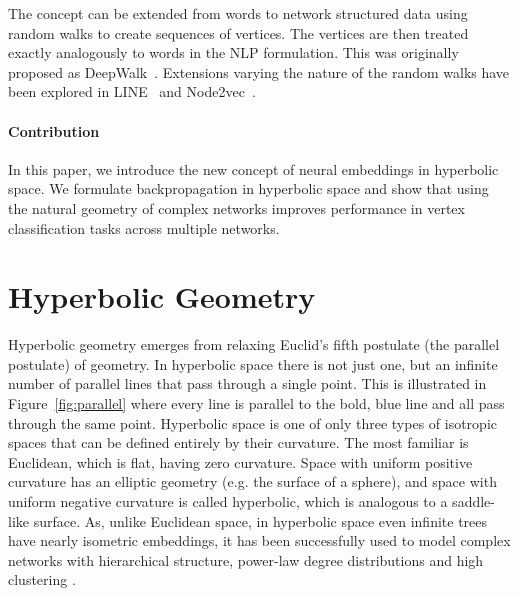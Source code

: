 \documentclass[sigconf, review]{acmart}
\begin{document}
The concept can be extended from words to network structured data using random walks to create sequences of vertices. The vertices are then treated exactly analogously to words in the NLP formulation. This was originally proposed as DeepWalk~\cite{Perozzi2014}. Extensions varying the nature of the random walks have been explored in LINE~\cite{Tang2015} and Node2vec~\cite{Grover}. 




\paragraph{Contribution}
In this paper, we introduce the new concept of neural embeddings in hyperbolic space. We formulate backpropagation in hyperbolic space and show that using the natural geometry of complex networks improves performance in vertex classification tasks across multiple networks.

\section{Hyperbolic Geometry}
Hyperbolic geometry emerges from relaxing Euclid's fifth postulate (the parallel postulate) of geometry. In hyperbolic space there is not just one, but an infinite number of parallel lines that pass through a single point. This is illustrated in Figure~\ref{fig:parallel} where every line is parallel to the bold, blue line and all pass through the same point. Hyperbolic space is one of only three types of isotropic spaces that can be defined entirely by their curvature. The most familiar is Euclidean, which is flat, having zero curvature. Space with uniform positive curvature has an elliptic geometry (e.g. the surface of a sphere), and space with uniform negative curvature is called hyperbolic, which is analogous to a saddle-like surface.
As, unlike Euclidean space, in hyperbolic space even infinite trees have nearly isometric embeddings, it has been successfully used to model complex networks with hierarchical structure, power-law degree distributions and high clustering \cite{Krioukov}.
\end{document}
